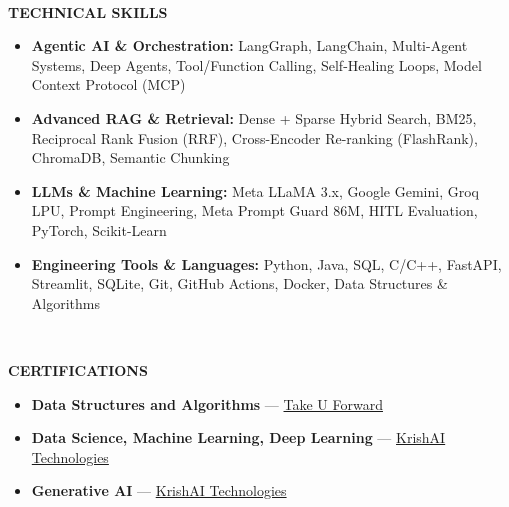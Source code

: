 \documentclass[a4paper,10pt]{article}
\newcommand{\resheading}[1]{\\[-0.2cm]{\small \colorbox{mygrey}{\begin{minipage}{0.975\textwidth}{\textbf{#1}}\end{minipage}}}}
\begin{document}
\resheading{\textbf{TECHNICAL SKILLS}}

\begin{itemize}
\item \textbf{Agentic AI \& Orchestration:} LangGraph, LangChain, Multi-Agent Systems, Deep Agents, Tool/Function Calling, Self-Healing Loops, Model Context Protocol (MCP)
\item \textbf{Advanced RAG \& Retrieval:} Dense + Sparse Hybrid Search, BM25, Reciprocal Rank Fusion (RRF), Cross-Encoder Re-ranking (FlashRank), ChromaDB, Semantic Chunking
\item \textbf{LLMs \& Machine Learning:} Meta LLaMA 3.x, Google Gemini, Groq LPU, Prompt Engineering, Meta Prompt Guard 86M, HITL Evaluation, PyTorch, Scikit-Learn
\item \textbf{Engineering Tools \& Languages:} Python, Java, SQL, C/C++, FastAPI, Streamlit, SQLite, Git, GitHub Actions, Docker, Data Structures \& Algorithms
\end{itemize}

\resheading{\textbf{CERTIFICATIONS}}

\begin{itemize}
\item \textbf{Data Structures and Algorithms} --- \href{https://static.takeuforward.org/certificate-dSicL1.pdf}{Take U Forward}
\item \textbf{Data Science, Machine Learning, Deep Learning} --- \href{https://www.udemy.com/certificate/UC-2e9f2e98-ea1d-4491-973a-c0f1f902d246/}{KrishAI Technologies}
\item \textbf{Generative AI} --- \href{https://www.udemy.com/certificate/UC-e668f427-ff2c-4ad2-bae1-731067820410/}{KrishAI Technologies}
\end{itemize}
\end{document}
